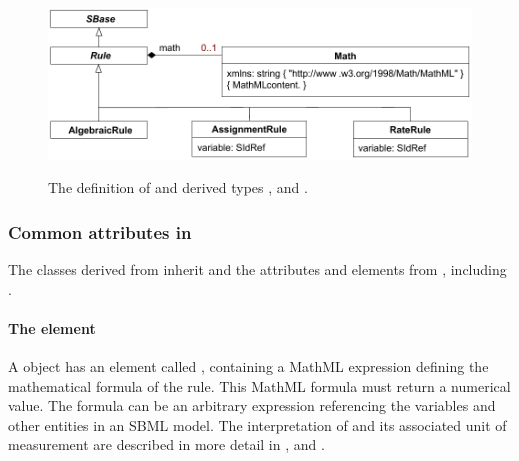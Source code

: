 \begin{figure}[htb]
  \centering
             {\includegraphics[scale=0.8]{figs/rule-uml}}
  \caption{The definition of \RuleUpright and derived types
      \AlgebraicRule, \AssignmentRule and \RateRule.}
  \label{fig:rules}
\end{figure}


\subsubsection{Common attributes in }
\label{sec:rule-math}\label{sec:rule-fields}\label{sec:rule-sboterm}

The classes derived from \Rule inherit  and the attributes and elements  from \SBase, including .


\label{sec:rule-id}



\paragraph{The  element}

A \Rule object has an element called ,
containing a MathML expression defining the mathematical formula
of the rule.  This MathML formula must return a numerical value.
The formula can be an arbitrary expression referencing the
variables and other entities in an SBML model.  The interpretation
of  and its associated unit of measurement are
described in more detail in ,
 and .

